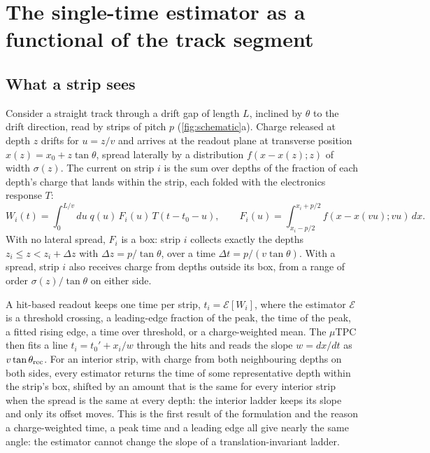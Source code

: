 \section{The single-time estimator as a functional of the track segment}\label{sec:formulation}

\subsection{What a strip sees}

Consider a straight track through a drift gap of length $L$, inclined by $\theta$ to the drift direction, read by strips of
pitch $p$ (\cref{fig:schematic}a). Charge released at depth $z$ drifts for $u = z/v$ and arrives at the readout plane at
transverse position $x(z) = x_0 + z\tan\theta$, spread laterally by a distribution $f(x - x(z); z)$ of width $\sigma(z)$. The
current on strip $i$ is the sum over depths of the fraction of each depth's charge that lands within the strip, each folded
with the electronics response $T$:
\begin{equation}
  W_i(t) = \int_0^{L/v} du\; q(u)\, F_i(u)\, T(t - t_0 - u), \qquad
  F_i(u) = \int_{x_i - p/2}^{x_i + p/2} f(x - x(vu); vu)\, dx .
  \label{eq:waveform}
\end{equation}
With no lateral spread, $F_i$ is a box: strip $i$ collects exactly the depths $z_i \le z < z_i + \Delta z$ with
$\Delta z = p/\tan\theta$, over a time $\Delta t = p/(v\tan\theta)$. With a spread, strip $i$ also receives charge from depths
outside its box, from a range of order $\sigma(z)/\tan\theta$ on either side.

A hit-based readout keeps one time per strip, $t_i = \mathcal{E}[W_i]$, where the estimator $\mathcal{E}$ is a threshold crossing,
a leading-edge fraction of the peak, the time of the peak, a fitted rising edge, a time over threshold, or a charge-weighted
mean. The $\mu$TPC then fits a line $t_i = t_0' + x_i/w$ through the hits and reads the slope $w = dx/dt$ as $v\tan\theta_{\rm rec}$.
For an interior strip, with charge from both neighbouring depths on both sides, every estimator returns the time of some
representative depth within the strip's box, shifted by an amount that is the same for every interior strip when the spread is
the same at every depth: the interior ladder keeps its slope and only its offset moves. This is the first result of the
formulation and the reason a charge-weighted time, a peak time and a leading edge all give nearly the same angle: the
estimator cannot change the slope of a translation-invariant ladder.

